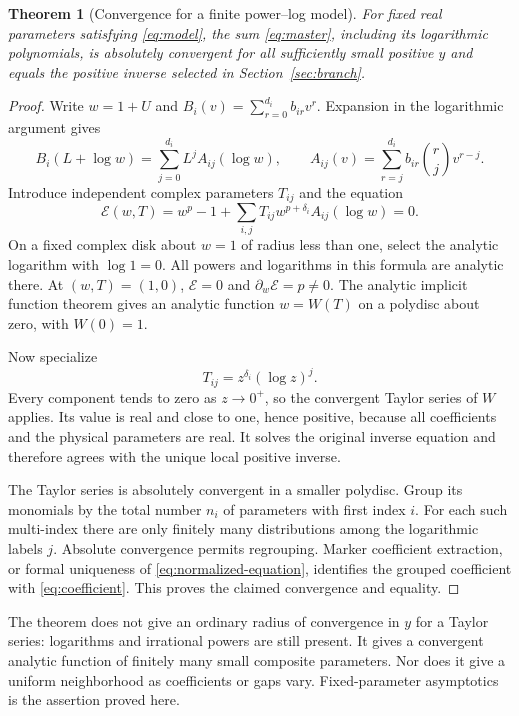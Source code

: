 \documentclass[11pt,a4paper]{article}
\numberwithin{equation}{section}
\newtheorem{theorem}{Theorem}[section]
\theoremstyle{definition}
\theoremstyle{remark}
\begin{document}
\begin{theorem}[Convergence for a finite power--log model]
For fixed real parameters satisfying \eqref{eq:model}, the sum
\eqref{eq:master}, including its logarithmic polynomials, is absolutely
convergent for all sufficiently small positive $y$ and equals the positive
inverse selected in Section~\ref{sec:branch}.
\end{theorem}
\begin{proof}
Write $w=1+U$ and $B_i(v)=\sum_{r=0}^{d_i}b_{ir}v^r$. Expansion in the
logarithmic argument gives
\[
 B_i(L+\log w)=\sum_{j=0}^{d_i}L^j A_{ij}(\log w),\qquad
 A_{ij}(v)=\sum_{r=j}^{d_i}b_{ir}\binom rj v^{r-j}.
\]
Introduce independent complex parameters $T_{ij}$ and the equation
\begin{equation}
 \mathcal E(w,T)=w^p-1+
 \sum_{i,j}T_{ij}w^{p+\delta_i}A_{ij}(\log w)=0.
 \label{eq:analytic-parameters}
\end{equation}
On a fixed complex disk about $w=1$ of radius less than one, select the
analytic logarithm with $\log1=0$. All powers and logarithms in this
formula are analytic there. At $(w,T)=(1,0)$,
$\mathcal E=0$ and $\partial_w\mathcal E=p\ne0$.
The analytic implicit function theorem gives an analytic function $w=W(T)$
on a polydisc about zero, with $W(0)=1$.

Now specialize
\begin{equation}
 T_{ij}=z^{\delta_i}(\log z)^j.
 \label{eq:physical-parameters}
\end{equation}
Every component tends to zero as $z\to0^+$, so the convergent Taylor series
of $W$ applies. Its value is real and close to one, hence positive, because
all coefficients and the physical parameters are real. It solves the
original inverse equation and therefore agrees with the unique local
positive inverse.

The Taylor series is absolutely convergent in a smaller polydisc. Group
its monomials by the total number $n_i$ of parameters with first index $i$.
For each such multi-index there are only finitely many distributions among
the logarithmic labels $j$. Absolute convergence permits regrouping.
Marker coefficient extraction, or formal uniqueness of
\eqref{eq:normalized-equation}, identifies the grouped coefficient with
\eqref{eq:coefficient}. This proves the claimed convergence and equality.
\end{proof}

The theorem does not give an ordinary radius of convergence in $y$ for a
Taylor series: logarithms and irrational powers are still present. It gives
a convergent analytic function of finitely many small composite parameters.
Nor does it give a uniform neighborhood as coefficients or gaps vary.
Fixed-parameter asymptotics is the assertion proved here.
\end{document}
